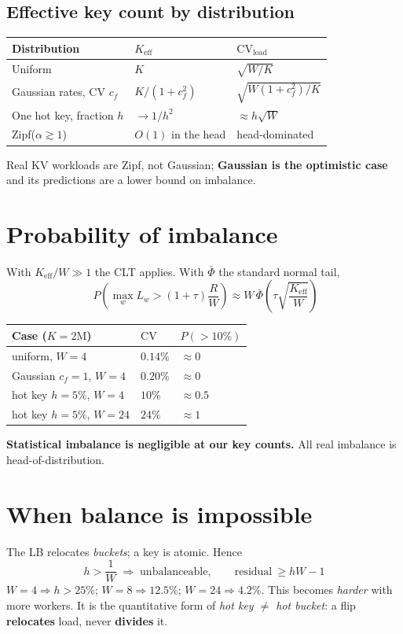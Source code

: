 \documentclass[11pt]{article}
\begin{document}
\subsection{Effective key count by distribution}
\begin{center}
\begin{tabular}{lll}
\toprule
Distribution & $K_{\mathrm{eff}}$ & $\mathrm{CV}_{\mathrm{load}}$ \\
\midrule
Uniform & $K$ & $\sqrt{W/K}$ \\
Gaussian rates, CV $c_f$ & $K/(1+c_f^2)$ & $\sqrt{W(1+c_f^2)/K}$ \\
One hot key, fraction $h$ & $\to 1/h^2$ & $\approx h\sqrt{W}$ \\
Zipf($\alpha\gtrsim1$) & $O(1)$ in the head & head-dominated \\
\bottomrule
\end{tabular}
\end{center}
Real KV workloads are Zipf, not Gaussian; \textbf{Gaussian is the optimistic case} and its
predictions are a lower bound on imbalance.

\section{Probability of imbalance}
With $K_{\mathrm{eff}}/W\gg1$ the CLT applies. With $\bar\Phi$ the standard normal tail,
\[
\boxed{\;P\!\left(\max_w L_w>(1+\tau)\frac{R}{W}\right)\approx
W\,\bar\Phi\!\left(\tau\sqrt{\frac{K_{\mathrm{eff}}}{W}}\right)}
\]

\begin{center}
\begin{tabular}{lll}
\toprule
Case ($K=2\mathrm{M}$) & $\mathrm{CV}$ & $P(>10\%)$ \\
\midrule
uniform, $W=4$ & $0.14\%$ & $\approx0$ \\
Gaussian $c_f=1$, $W=4$ & $0.20\%$ & $\approx0$ \\
hot key $h=5\%$, $W=4$ & $10\%$ & $\approx0.5$ \\
hot key $h=5\%$, $W=24$ & $24\%$ & $\approx1$ \\
\bottomrule
\end{tabular}
\end{center}
\noindent\textbf{Statistical imbalance is negligible at our key counts.} All real imbalance is
head-of-distribution.

\section{When balance is impossible}
The LB relocates \emph{buckets}; a key is atomic. Hence
\[
\boxed{\;h>\frac{1}{W}\;\Longrightarrow\;\text{unbalanceable},\qquad
\text{residual}\ \ge hW-1\;}
\]
$W=4\Rightarrow h>25\%$; $W=8\Rightarrow12.5\%$; $W=24\Rightarrow\mathbf{4.2\%}$.
This becomes \emph{harder} with more workers. It is the quantitative form of
\emph{hot key $\neq$ hot bucket}: a flip \textbf{relocates} load, never \textbf{divides} it.
\end{document}
